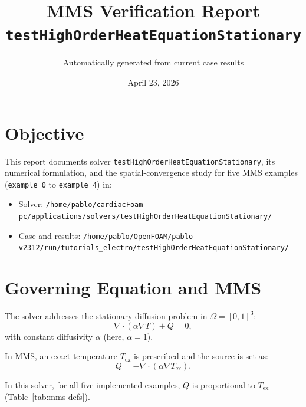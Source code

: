 \documentclass[11pt,a4paper]{article}
\title{MMS Verification Report\\
\large \texttt{testHighOrderHeatEquationStationary}}
\author{Automatically generated from current case results}
\date{April 23, 2026}
\begin{document}
\maketitle

\section{Objective}
This report documents solver \texttt{testHighOrderHeatEquationStationary}, its numerical formulation, and the spatial-convergence study for five MMS examples (\texttt{example\_0} to \texttt{example\_4}) in:
\begin{itemize}
\item Solver: \texttt{/home/pablo/cardiacFoam-pc/applications/solvers/testHighOrderHeatEquationStationary/}
\item Case and results: \texttt{/home/pablo/OpenFOAM/pablo-v2312/run/tutorials\_electro/testHighOrderHeatEquationStationary/}
\end{itemize}

\section{Governing Equation and MMS}
The solver addresses the stationary diffusion problem in $\Omega=[0,1]^3$:
\begin{equation}
\nabla\cdot\left(\alpha\nabla T\right) + Q = 0,
\end{equation}
with constant diffusivity $\alpha$ (here, $\alpha=1$).

In MMS, an exact temperature $T_{\mathrm{ex}}$ is prescribed and the source is set as:
\begin{equation}
Q = -\nabla\cdot\left(\alpha\nabla T_{\mathrm{ex}}\right).
\end{equation}

In this solver, for all five implemented examples, $Q$ is proportional to $T_{\mathrm{ex}}$ (Table~\ref{tab:mms-defs}).
\end{document}
